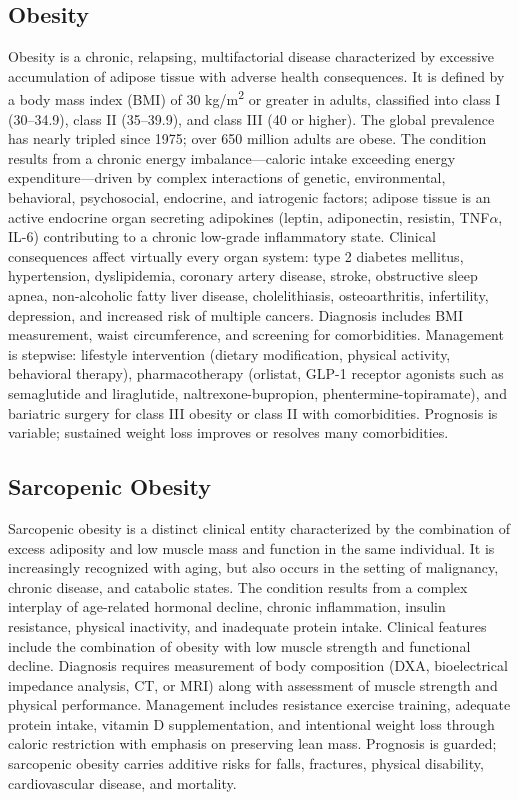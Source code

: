 \subsection{Obesity}
\label{sec:Obesity}
Obesity is a chronic, relapsing, multifactorial disease characterized by excessive accumulation of adipose tissue with adverse health consequences. It is defined by a body mass index (BMI) of 30 kg/m\textsuperscript{2} or greater in adults, classified into class I (30--34.9), class II (35--39.9), and class III (40 or higher). The global prevalence has nearly tripled since 1975; over 650 million adults are obese. The condition results from a chronic energy imbalance---caloric intake exceeding energy expenditure---driven by complex interactions of genetic, environmental, behavioral, psychosocial, endocrine, and iatrogenic factors; adipose tissue is an active endocrine organ secreting adipokines (leptin, adiponectin, resistin, TNF$\alpha$, IL-6) contributing to a chronic low-grade inflammatory state. Clinical consequences affect virtually every organ system: type 2 diabetes mellitus, hypertension, dyslipidemia, coronary artery disease, stroke, obstructive sleep apnea, non-alcoholic fatty liver disease, cholelithiasis, osteoarthritis, infertility, depression, and increased risk of multiple cancers. Diagnosis includes BMI measurement, waist circumference, and screening for comorbidities. Management is stepwise: lifestyle intervention (dietary modification, physical activity, behavioral therapy), pharmacotherapy (orlistat, GLP-1 receptor agonists such as semaglutide and liraglutide, naltrexone-bupropion, phentermine-topiramate), and bariatric surgery for class III obesity or class II with comorbidities. Prognosis is variable; sustained weight loss improves or resolves many comorbidities.

\subsection{Sarcopenic Obesity}
\label{sec:Sarcopenic Obesity}
Sarcopenic obesity is a distinct clinical entity characterized by the combination of excess adiposity and low muscle mass and function in the same individual. It is increasingly recognized with aging, but also occurs in the setting of malignancy, chronic disease, and catabolic states. The condition results from a complex interplay of age-related hormonal decline, chronic inflammation, insulin resistance, physical inactivity, and inadequate protein intake. Clinical features include the combination of obesity with low muscle strength and functional decline. Diagnosis requires measurement of body composition (DXA, bioelectrical impedance analysis, CT, or MRI) along with assessment of muscle strength and physical performance. Management includes resistance exercise training, adequate protein intake, vitamin D supplementation, and intentional weight loss through caloric restriction with emphasis on preserving lean mass. Prognosis is guarded; sarcopenic obesity carries additive risks for falls, fractures, physical disability, cardiovascular disease, and mortality.

